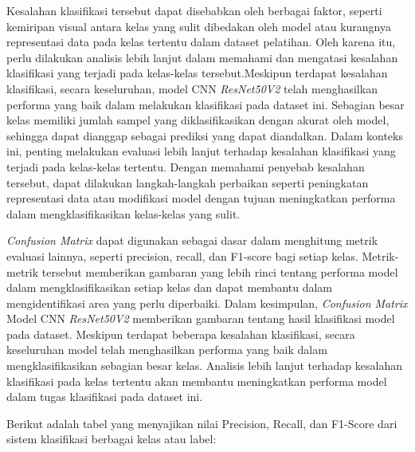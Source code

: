 Kesalahan klasifikasi tersebut dapat disebabkan oleh berbagai faktor, seperti kemiripan visual antara kelas yang sulit dibedakan oleh model atau kurangnya representasi data pada kelas tertentu dalam dataset pelatihan. Oleh karena itu, perlu dilakukan analisis lebih lanjut dalam memahami dan mengatasi kesalahan klasifikasi yang terjadi pada kelas-kelas tersebut.Meskipun terdapat kesalahan klasifikasi, secara keseluruhan, model CNN \textit{ResNet50V2} telah menghasilkan performa yang baik dalam melakukan klasifikasi pada dataset ini. Sebagian besar kelas memiliki jumlah sampel yang diklasifikasikan dengan akurat oleh model, sehingga dapat dianggap sebagai prediksi yang dapat diandalkan.
Dalam konteks ini, penting melakukan evaluasi lebih lanjut terhadap kesalahan klasifikasi yang terjadi pada kelas-kelas tertentu. Dengan memahami penyebab kesalahan tersebut, dapat dilakukan langkah-langkah perbaikan seperti peningkatan representasi data atau modifikasi model dengan tujuan meningkatkan performa dalam mengklasifikasikan kelas-kelas yang sulit.

\textit{Confusion Matrix} dapat digunakan sebagai dasar dalam menghitung metrik evaluasi lainnya, seperti precision, recall, dan F1-score bagi setiap kelas. Metrik-metrik tersebut memberikan gambaran yang lebih rinci tentang performa model dalam mengklasifikasikan setiap kelas dan dapat membantu dalam mengidentifikasi area yang perlu diperbaiki.
Dalam kesimpulan, \textit{Confusion Matrix} Model CNN \textit{ResNet50V2} memberikan gambaran tentang hasil klasifikasi model pada dataset. Meskipun terdapat beberapa kesalahan klasifikasi, secara keseluruhan model telah menghasilkan performa yang baik dalam mengklasifikasikan sebagian besar kelas. Analisis lebih lanjut terhadap kesalahan klasifikasi pada kelas tertentu akan membantu meningkatkan performa model dalam tugas klasifikasi pada dataset ini.

Berikut adalah tabel yang menyajikan nilai Precision, Recall, dan F1-Score dari sistem klasifikasi berbagai kelas atau label:

